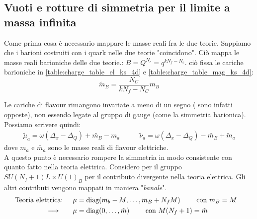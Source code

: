 \documentclass[a4paper,12pt]{article}
\begin{document}
\subsection{Vuoti e rotture di simmetria per il limite a massa infinita}
Come prima cosa è necessario mappare le masse reali fra le due teorie. Sappiamo che i barioni costruiti con i quark nelle due teorie "coincidono". Ciò mappa le masse reali barioniche delle due teorie.: $ B = Q^{N_c} = q^{k N_f - N_c} $. ciò fissa  le cariche barioniche in \ref{table:charge_table_el_ks_4d} e \ref{table:charge_table_mag_ks_4d}:
$$
		\tilde{m}_B = \frac{ N_C}{ kN_f - N_C } m_B
$$

Le cariche di flavour rimangono invariate a meno di un segno ( sono infatti opposte), non essendo legate al gruppo di gauge (come la simmetria barionica).\\
Possiamo scrivere quindi:
\begin{align*}
 \tilde \mu_a = \omega ( \Delta_x - \Delta_Q ) + \tilde{m_B} - m_a    \qquad &  \tilde \nu_a = \omega ( \Delta_x - \Delta_Q ) - \tilde{m_B} + \tilde m_a
\end{align*}
dove $ m_a$ e $\tilde{m_a}$ sono le masse reali di flavour elettriche.\\
A questo punto è necessario rompere la simmetria in modo consistente con quanto fatto nella teoria elettrica.
Considero per il gruppo $SU(N_f+1)L \times U(1)_B$ per il contributo divergente nella teoria elettrica. Gli altri contributi vengono mappati in maniera "\emph{banale}".
\begin{align*}
\hbox{Teoria elettrica: }  \quad &  \mu = \mbox{diag} ( m_b - M, \dots , m_B+ N_f M) \qquad \mbox{ con } m_B = M \quad \\
 \longrightarrow  \qquad & \mu = \mbox{diag} ( 0, \dots , \hat{m}) \qquad \mbox{ con } M(N_f+1) = \hat{m}
\end{align*}
\end{document}
